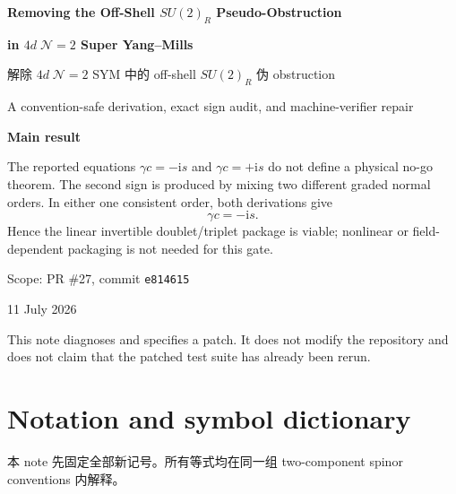 \documentclass[11pt,a4paper,UTF8]{ctexart}
\numberwithin{equation}{section}
\newcommand{\ii}{\mathrm i}
\begin{document}
\begin{titlepage}
\centering
\vspace*{18mm}
{\sffamily\bfseries\fontsize{24}{29}\selectfont
Removing the Off-Shell $SU(2)_R$ Pseudo-Obstruction\par}
\vspace{2mm}
{\sffamily\bfseries\fontsize{19}{24}\selectfont
in $4d\;\mathcal N=2$ Super Yang--Mills\par}
\vspace{7mm}
{\Large 解除 $4d\;\mathcal N=2$ SYM 中的 off-shell $SU(2)_R$ 伪 obstruction\par}
\vspace{9mm}
{\large A convention-safe derivation, exact sign audit, and machine-verifier repair\par}
\vspace{16mm}
\begin{tcolorbox}[width=0.88\textwidth,colback=softgreen,colframe=deepgreen,boxrule=1pt,arc=2mm]
\centering
\textbf{Main result}\par\medskip
The reported equations $\gamma c=-\ii s$ and $\gamma c=+\ii s$ do not define a physical no-go theorem.  The second sign is produced by mixing two different graded normal orders.  In either one consistent order, both derivations give
\[
\boxed{\gamma c=-\ii s}.
\]
Hence the linear invertible doublet/triplet package is viable; nonlinear or field-dependent packaging is not needed for this gate.
\end{tcolorbox}
\vfill
{\large Scope: PR \#27, commit \texttt{e814615}\par}
\vspace{2mm}
{\large 11 July 2026\par}
\vspace{5mm}
{\small This note diagnoses and specifies a patch.  It does not modify the repository and does not claim that the patched test suite has already been rerun.\par}
\end{titlepage}

\tableofcontents
\clearpage

\section*{Notation and symbol dictionary}

本 note 先固定全部新记号。所有等式均在同一组 two-component spinor conventions 内解释。
\end{document}
